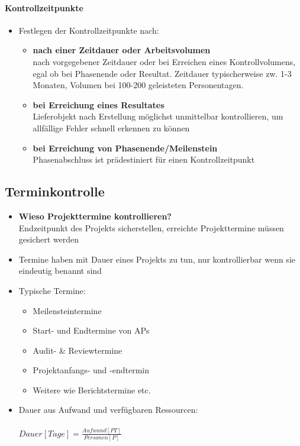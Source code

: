 \documentclass[a4paper]{article}
\begin{document}
		\paragraph{Kontrollzeitpunkte}
	
		\begin{itemize}
			\item Festlegen der Kontrollzeitpunkte nach:
				\begin{itemize}
					\item \textbf{nach einer Zeitdauer oder Arbeitsvolumen}\\
						nach vorgegebener Zeitdauer oder bei Erreichen eines Kontrollvolumens, egal ob bei Phasenende oder Resultat.
						Zeitdauer typischerweise zw. 1-3 Monaten, Volumen bei 100-200 geleisteten Personentagen.
					\item \textbf{bei Erreichung eines Resultates}\\
						Lieferobjekt nach Erstellung möglichst unmittelbar kontrollieren, um allfällige Fehler schnell erkennen zu können
					\item \textbf{bei Erreichung von Phasenende/Meilenstein}\\
						Phasenabschluss ist prädestiniert für einen Kontrollzeitpunkt
				\end{itemize}
		\end{itemize}
		
\newpage

	\subsection{Terminkontrolle}
		
	\begin{itemize}
		\item \textbf{Wieso Projekttermine kontrollieren?}\\
			Endzeitpunkt des Projekts sicherstellen, erreichte Projekttermine müssen gesichert werden
		\item Termine haben mit Dauer eines Projekts zu tun, nur kontrollierbar wenn sie eindeutig benannt sind
		\item Typische Termine:
			\begin{itemize}
				\item Meilensteintermine
				\item Start- und Endtermine von APs
				\item Audit- \& Reviewtermine
				\item Projektanfangs- und -endtermin
				\item Weitere wie Berichtstermine etc.
			\end{itemize}
		\item Dauer aus Aufwand und verfügbaren Ressourcen:\\
			\\
			$Dauer[Tage] = \frac{Aufwand[PT]}{Personen[P]}$
	\end{itemize}
		
\end{document}
